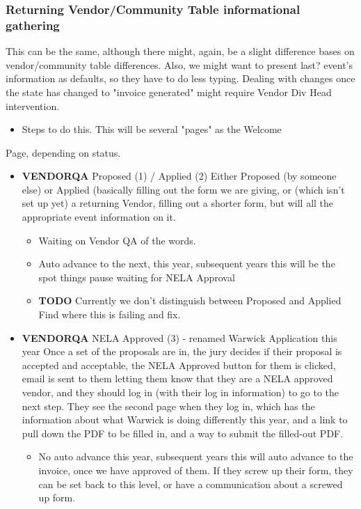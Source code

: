 \documentclass[captions=tablesignature]{scrartcl}
\begin{document}
\subsubsection{Returning Vendor/Community Table informational gathering}
\label{sec-3-1-5}
This can be the same, although there might, again, be a slight
difference bases on vendor/community table differences.  Also, we
might want to present last? event's information as defaults, so
they have to do less typing. Dealing with changes once the state
has changed to "invoice generated" might require Vendor Div Head
intervention.
\begin{itemize}
\item Steps to do this.  This will be several "pages" as the Welcome
\end{itemize}
Page, depending on status.
\begin{itemize}
\item {\bfseries\sffamily VENDORQA} Proposed (1) / Applied (2)
\label{sec-3-1-5-1}
Either Proposed (by someone else) or Applied (basically filling
out the form we are giving, or (which isn't set up yet) a
returning Vendor, filling out a shorter form, but will all the
appropriate event information on it.
\begin{itemize}
\item Waiting on Vendor QA of the words.
\item Auto advance to the next, this year, subsequent years this will
be the spot things pause waiting for NELA Approval
\end{itemize}
\begin{itemize}
\item {\bfseries\sffamily TODO} Currently we don't distinguish between Proposed and Applied
\label{sec-3-1-5-1-1}
Find where this is failing and fix.
\end{itemize}

\item {\bfseries\sffamily VENDORQA} NELA Approved (3) - renamed Warwick Application this year
\label{sec-3-1-5-2}
Once a set of the proposals are in, the jury decides if their
proposal is accepted and acceptable, the NELA Approved button for
them is clicked, email is sent to them letting them know that
they are a NELA approved vendor, and they should log in (with
their log in information) to go to the next step.  They see the
second page when they log in, which has the information about
what Warwick is doing differently this year, and a link to pull
down the PDF to be filled in, and a way to submit the filled-out
PDF.
\begin{itemize}
\item No auto advance this year, subsequent years this will auto
advance to the invoice, once we have approved of them.  If they
screw up their form, they can be set back to this level, or
have a communication about a screwed up form.
\end{itemize}


\end{itemize}
\end{document}
